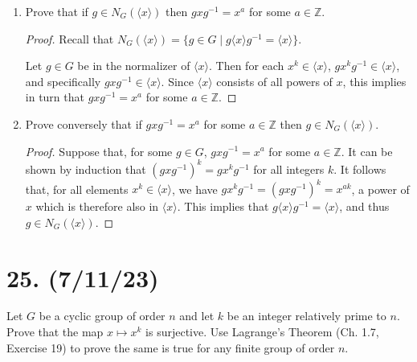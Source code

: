 \documentclass{article}
\begin{document}
\begin{enumerate}[label=(\alph*), itemsep=0em]
    \item Prove that if $g \in N_G(\langle x \rangle)$ then $gxg^{-1} = x^a$ for some $a \in \mathbb{Z}$.
          \begin{proof}
            Recall that $N_G(\langle x \rangle) = \{ g \in G \mid g \langle x \rangle g^{-1} = \langle x \rangle \}$.

            Let $g \in G$ be in the normalizer of $\langle x \rangle$. Then for each $x^k \in \langle x \rangle$, $gx^kg^{-1} \in \langle x \rangle$, and specifically $gxg^{-1} \in \langle x \rangle$. Since $\langle x \rangle$ consists of all powers of $x$, this implies in turn that $gxg^{-1} = x^a$ for some $a \in \mathbb{Z}$.
          \end{proof}
    \item Prove conversely that if $gxg^{-1} = x^a$ for some $a \in \mathbb{Z}$ then $g \in N_G(\langle x \rangle)$.
          \begin{proof}
            Suppose that, for some $g \in G$, $gxg^{-1} = x^a$ for some $a \in \mathbb{Z}$. It can be shown by induction that $(gxg^{-1})^k = gx^kg^{-1}$ for all integers $k$. It follows that, for all elements $x^k \in \langle x \rangle$, we have $gx^kg^{-1} = (gxg^{-1})^k = x^{ak}$, a power of $x$ which is therefore also in $\langle x \rangle$. This implies that $g \langle x \rangle g^{-1} = \langle x \rangle$, and thus $g \in N_G(\langle x \rangle)$.
          \end{proof}
\end{enumerate}

\section*{25. (7/11/23)}

Let $G$ be a cyclic group of order $n$ and let $k$ be an integer relatively prime to $n$. Prove that the map $x \mapsto x^k$ is surjective. Use Lagrange's Theorem (Ch. 1.7, Exercise 19) to prove the same is true for any finite group of order $n$.
\end{document}
